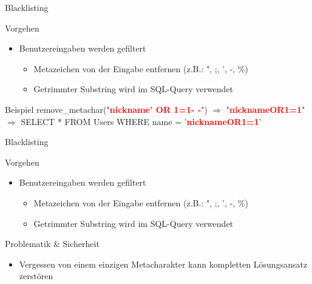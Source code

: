 \begin{frame}{Blacklisting}
\begin{block}{Vorgehen}
\begin{itemize}[<+->]
\item Benutzereingaben werden gefiltert
	\begin{itemize}
	\item Metazeichen von der Eingabe entfernen (z.B.: ", ;, ', -, \%)
	\item Getrimmter Substring wird im SQL-Query verwendet
	\end{itemize}
\end{itemize}
\end{block}
\begin{block}{Beispiel}	
	remove\_metachar("{}\textcolor{red}{\textbf{nickname'{} OR 1=1- -}}{}") $\Rightarrow$ "{}\textcolor{red}{\textbf{nicknameOR1=1}}{}" \\
	$\Rightarrow$ SELECT * FROM Users WHERE name = '{}\textcolor{red}{\textbf{nicknameOR1=1}}'{}

\end{block}
\end{frame}

\begin{frame}{Blacklisting}
\begin{block}{Vorgehen}
\begin{itemize}
\item Benutzereingaben werden gefiltert
	\begin{itemize}
	\item Metazeichen von der Eingabe entfernen (z.B.: ", ;, ', -, \%)
	\item Getrimmter Substring wird im SQL-Query verwendet
	\end{itemize}
\end{itemize}
\end{block}
\begin{block}{Problematik \& Sicherheit}	
\begin{itemize}[<+->]
\item Vergessen von einem einzigen Metacharakter kann kompletten Lösungsansatz zerstören
\end{itemize}
\end{block}
\end{frame}


